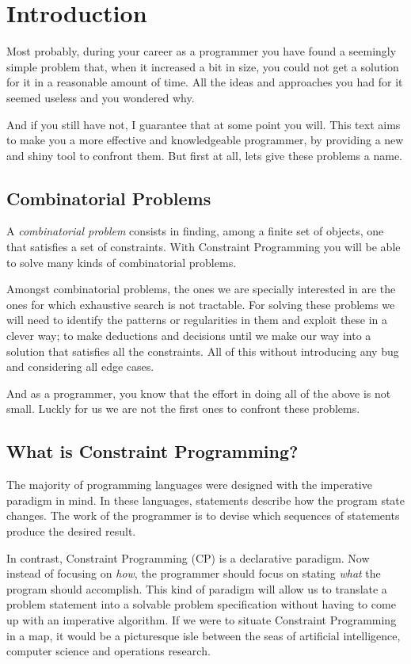 \section{Introduction}

Most probably, during your career as a programmer you have found
a seemingly simple problem that, when it increased a bit in size, you could not
get a solution for it in a reasonable amount of time. All the ideas and approaches
you had for it seemed useless and you wondered why.

And if you still have not, I guarantee that at some point you will.
This text aims to make you a more effective and knowledgeable programmer,
by providing a new and shiny tool to confront them. But first at all, lets give 
these problems a name.

\subsection{Combinatorial Problems}

A \emph{combinatorial problem} consists in finding, among a finite set of
objects, one that satisfies a set of constraints. With Constraint Programming
you will be able to solve many kinds of combinatorial problems. 

Amongst combinatorial problems, the ones we are specially interested in are the
ones for which exhaustive search is not tractable. For solving these problems
we will need to identify the patterns or regularities in them and exploit these
in a clever way; to make deductions and decisions until we make our way into a
solution that satisfies all the constraints. All of this without introducing any
bug and considering all edge cases.

And as a programmer, you know that the effort in doing all of the above is not
small. Luckly for us we are not the first ones to confront these problems.

\subsection{What is Constraint Programming?}

The majority of programming languages were designed with the imperative
paradigm in mind. In these languages, statements describe how the program state
changes.  The work of the programmer is to devise which sequences of statements
produce the desired result.

In contrast, Constraint Programming (CP) is a declarative paradigm. Now instead
of focusing on \emph{how}, the programmer should focus on stating \emph{what}
the program should accomplish. This kind of paradigm will allow us to translate
a problem statement into a solvable problem specification without having to
come up with an imperative algorithm.  If we were to situate Constraint
Programming in a map, it would be a picturesque isle between the seas of
artificial intelligence, computer science and operations research.

